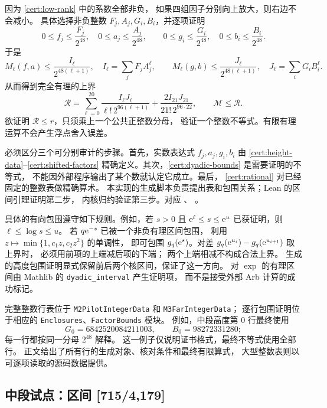 因为 \eqref{cert:low-rank} 中的系数全部非负，
如果四组因子分别向上放大，则右边不会减小。
具体选择非负整数
$F_j,A_j,G_i,B_i$，并逐项证明
\begin{equation}\label{cert:dyadic-bounds}
 0\leq f_j\leq\frac{F_j}{2^{48}},\quad
 0\leq a_j\leq\frac{A_j}{2^{48}},\qquad
 0\leq g_i\leq\frac{G_i}{2^{48}},\quad
 0\leq b_i\leq\frac{B_i}{2^{48}}.
\end{equation}
于是
\[
 M_\ell(f,a)\leq
 \frac{I_\ell}{2^{48(\ell+1)}},
 \quad I_\ell=\sum_j F_jA_j^\ell,
 \qquad
 M_\ell(g,b)\leq
 \frac{J_\ell}{2^{48(\ell+1)}},
 \quad J_\ell=\sum_i G_iB_i^\ell .
\]
从而得到完全有理的上界
\begin{equation}\label{cert:rational}
 \mathcal R=
 \sum_{\ell=0}^{20}
  \frac{I_\ell J_\ell}{\ell!\,2^{96(\ell+1)}}
  +\frac{2I_{21}J_{21}}{21!\,2^{96\cdot22}},
 \qquad \mathcal M\leq\mathcal R.
\end{equation}
欲证明 $\mathcal R\leq r$，只须乘上一个公共正整数分母，
验证一个整数不等式。有限有理运算不会产生浮点舍入误差。

必须区分三个可分别审计的步骤。首先，实数表达式
$f_j,a_j,g_i,b_i$ 由 \eqref{cert:height-data}--\eqref{cert:shifted-factors}
精确定义。其次，\eqref{cert:dyadic-bounds} 是需要证明的不等式，
不能因外部程序输出了某个数就认定它成立。最后，
\eqref{cert:rational} 对已经固定的整数表做精确算术。
本实现的生成脚本负责提出表和包围关系；Lean 的区间引理证明第二步，
内核归约验证第三步。对应
、
。

具体的有向包围遵守如下规则。例如，若 $s>0$ 且
$\mathrm e^\ell\leq s\leq\mathrm e^u$ 已获证明，则 $\ell\leq\log s\leq u$。
若 $q\mathrm e^{-s}$ 已被一个非负有理区间包围，
利用 $z\mapsto\min\{1,c_1z,c_2z^2\}$ 的单调性，
即可包围 $g_q(\mathrm e^s)$。对差
$g_q(\mathrm e^{u_i})-g_q(\mathrm e^{u_{i+1}})$ 取上界时，
必须用前项的上端减后项的下端；
两个上端相减不构成合法上界。
生成的高度包围证明显式保留前后两个核区间，保证了这一方向。
对 $\exp$ 的有理区间由 Mathlib 的
\texttt{dyadic\_interval} 产生证明项，
而不是接受外部 Arb 计算的成功标记。

完整整数行表位于
\texttt{M2PilotIntegerData} 和 \texttt{M3FarIntegerData}；
逐行包围证明位于相应的
\texttt{Enclosures}、\texttt{FactorBounds} 模块。
例如，中段高度第 $0$ 行最终使用
\[
 G_0=6842520084211003,\qquad B_0=98272331280;
\]
每一行都按同一分母 $2^{48}$ 解释。
这一例子仅说明证书格式，最终不等式使用全部行。
正文给出了所有行的生成对象、核对条件和最终有限算式，
大型整数表则以可逐项读取的源码数据提供。

\subsection{中段试点：区间 [715/4,179]}

